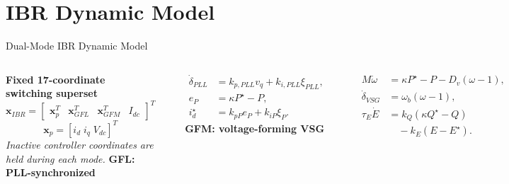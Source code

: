 \documentclass{beamer}
\begin{document}
\section{IBR Dynamic Model}
\begin{frame}{Dual-Mode IBR Dynamic Model}
\begin{columns}[t,onlytextwidth]
\scriptsize
\textbf{Fixed 17-coordinate switching superset}
\[
\bm{x}_{IBR}=\begin{bmatrix}
\bm{x}_{p}^{T}&\bm{x}_{GFL}^{T}&\bm{x}_{GFM}^{T}&I_{dc}
\end{bmatrix}^{T}
\]
\[
\bm{x}_{p}=[i_d\;i_q\;V_{dc}]^T
\]
\vspace{0.08cm}
\textit{Inactive controller coordinates are held during each mode.}
\scriptsize
{\color{myblue}\textbf{GFL: PLL-synchronized}}\\[-0.15em]
\rule{\linewidth}{0.35pt}
\begin{align*}
\dot\delta_{PLL}&=k_{p,PLL}v_q+k_{i,PLL}\xi_{PLL},\\
e_P&=\kappa P^\star-P,\\
i_d^\star&=k_{pP}e_P+k_{iP}\xi_P.
\end{align*}
\vspace{0.25cm}
{\color{myblue}\textbf{GFM: voltage-forming VSG}}\\[-0.15em]
\rule{\linewidth}{0.35pt}
\begin{align*}
M\dot\omega&=\kappa P^\star-P-D_v(\omega-1),\\
\dot\delta_{VSG}&=\omega_b(\omega-1),\\
\tau_E\dot E&=k_Q(\kappa Q^\star-Q)\\
&\quad-k_E(E-E^\star).
\end{align*}
\end{columns}
\end{frame}
\end{document}
